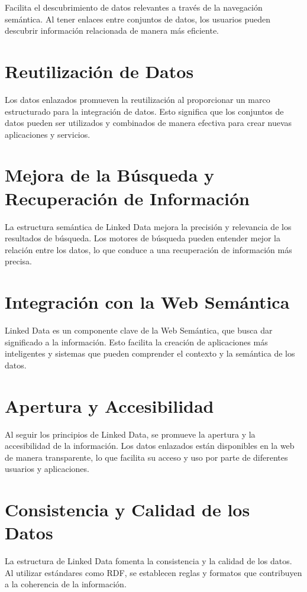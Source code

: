 \documentclass[11pt]{report}
\begin{document}
		Facilita el descubrimiento de datos relevantes a través de la navegación semántica. Al tener enlaces entre conjuntos de datos, los usuarios pueden descubrir información relacionada de manera más eficiente.
\section{Reutilización de Datos}

		Los datos enlazados promueven la reutilización al proporcionar un marco estructurado para la integración de datos. Esto significa que los conjuntos de datos pueden ser utilizados y combinados de manera efectiva para crear nuevas aplicaciones y servicios.
\section{Mejora de la Búsqueda y Recuperación de Información}

		La estructura semántica de Linked Data mejora la precisión y relevancia de los resultados de búsqueda. Los motores de búsqueda pueden entender mejor la relación entre los datos, lo que conduce a una recuperación de información más precisa.
\section{Integración con la Web Semántica}

		Linked Data es un componente clave de la Web Semántica, que busca dar significado a la información. Esto facilita la creación de aplicaciones más inteligentes y sistemas que pueden comprender el contexto y la semántica de los datos.
\section{Apertura y Accesibilidad}

		Al seguir los principios de Linked Data, se promueve la apertura y la accesibilidad de la información. Los datos enlazados están disponibles en la web de manera transparente, lo que facilita su acceso y uso por parte de diferentes usuarios y aplicaciones.
\section{Consistencia y Calidad de los Datos}

		La estructura de Linked Data fomenta la consistencia y la calidad de los datos. Al utilizar estándares como RDF, se establecen reglas y formatos que contribuyen a la coherencia de la información.
\end{document}
